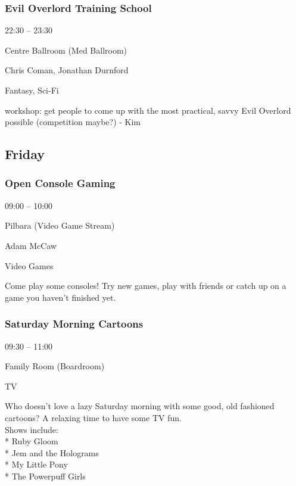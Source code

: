 \documentclass{scrreprt}
\begin{document}
\begin{multicols}{2}
\subsubsection*{Evil Overlord Training School}\begin{description}
\setlength{\itemsep}{0pt}
\setlength{\parsep}{0pt}
\setlength{\parskip}{0pt}
\item[Time:]{22:30 -- 23:30}
\item[Venue:]{Centre Ballroom (Med Ballroom)}
\item[People:]{Chris Coman, Jonathan Durnford}
\item[Tags:]{Fantasy, Sci-Fi}\end{description}
workshop: get people to come up with the most practical, savvy Evil Overlord possible (competition maybe?) - Kim
\subsection*{Friday}\subsubsection*{Open Console Gaming}\begin{description}
\setlength{\itemsep}{0pt}
\setlength{\parsep}{0pt}
\setlength{\parskip}{0pt}
\item[Time:]{09:00 -- 10:00}
\item[Venue:]{Pilbara (Video Game Stream)}
\item[People:]{Adam McCaw}
\item[Tags:]{Video Games}\end{description}
Come play some consoles! Try new games, play with friends or catch up on a game you haven't finished yet.
\subsubsection*{Saturday Morning Cartoons}\begin{description}
\setlength{\itemsep}{0pt}
\setlength{\parsep}{0pt}
\setlength{\parskip}{0pt}
\item[Time:]{09:30 -- 11:00}
\item[Venue:]{Family Room (Boardroom)}
\item[Tags:]{TV}\end{description}
Who doesn't love a lazy Saturday morning with some good, old fashioned cartoons? A relaxing time to have some TV fun. \\Shows include:\\  * Ruby Gloom\\  * Jem and the Holograms\\  * My Little Pony\\  * The Powerpuff Girls

\end{multicols}
\end{document}
